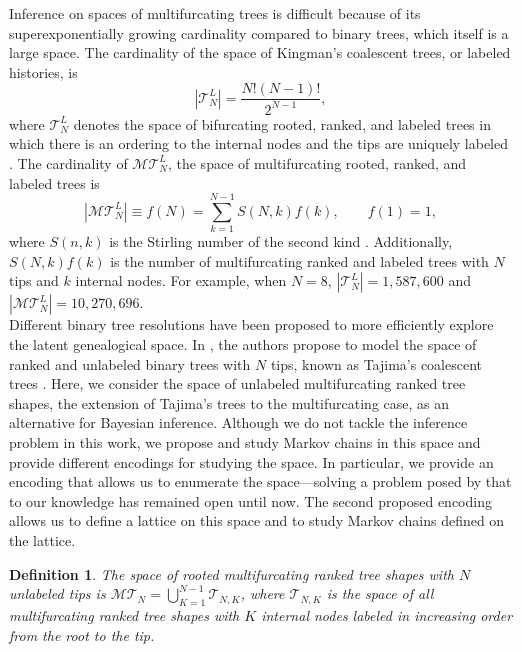 \documentclass{article}
\newtheorem{definition}{Definition}
\begin{document}
Inference on spaces of multifurcating trees is difficult because of its superexponentially growing cardinality compared to binary trees, which itself is a large space. The cardinality of the space of Kingman's coalescent trees, or labeled histories, is 
\begin{equation}\label{eq:l-r-binary}
    | \mathcal{T}_N^L | = \frac{N!(N-1)!}{2^{N-1}},
\end{equation}
where $\mathcal{T}_N^L$ denotes the space of bifurcating rooted, ranked, and labeled trees in which there is an ordering to the internal nodes and the tips are uniquely labeled \citep{edwards1970estimation}. The cardinality of $\mathcal{MT}_N^L$, the space of multifurcating rooted, ranked, and labeled trees is 
\begin{equation} \label{eq:l-r-multi}
    | \mathcal{MT}_N^L| \equiv f(N) = \sum_{k=1}^{N-1} S(N,k) f(k), \qquad f(1)=1,
\end{equation}
where $S(n,k)$ is the Stirling number of the second kind \citep{Murtagh1984}. Additionally, $S(N,k)f(k)$ is the number of multifurcating ranked and labeled trees with $N$ tips and $k$ internal nodes. For example, when $N=8$, $|\mathcal{T}_N^L |= 1,587,600$ and $| \mathcal{MT}_N^L| = 10,270,696$. \\

Different binary tree resolutions have been proposed to more efficiently explore the latent genealogical space. In \cite{palacios2019bayesian}, the authors propose to model the space of ranked and unlabeled binary trees with $N$ tips, known as Tajima's coalescent trees \citep{Sainudiin2015}. Here, we consider the space of unlabeled multifurcating ranked tree shapes, the extension of Tajima's trees to the multifurcating case, as an alternative for Bayesian inference. Although we do not tackle the inference problem in this work, we propose and study Markov chains in this space and provide different encodings for studying the space. In particular, we provide an encoding that allows us to enumerate the space---solving a problem posed by \cite{Murtagh1984} that to our knowledge has remained open until now. The second proposed encoding allows us to define a lattice on this space and to study Markov chains defined on the lattice. 

\begin{definition}
The space of rooted multifurcating ranked tree shapes with $N$ unlabeled tips is $\mathcal{MT}_{N}=\bigcup_{K=1}^{N-1}\mathcal{T}_{N,K}$, where $\mathcal{T}_{N,K}$ is the space of all multifurcating ranked tree shapes with $K$ internal nodes labeled in increasing order from the root to the tip. 
\end{definition}
\end{document}

